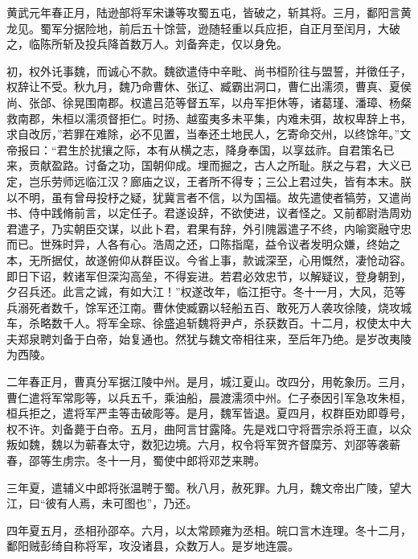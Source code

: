 \documentclass[12pt,UTF8]{ctexbook}
\begin{document}
黄武元年春正月，陆逊部将军宋谦等攻蜀五屯，皆破之，斩其将。三月，鄱阳言黄龙见。蜀军分据险地，前后五十馀营，逊随轻重以兵应拒，自正月至闰月，大破之，临陈所斩及投兵降首数万人。刘备奔走，仅以身免。

初，权外讬事魏，而诚心不款。魏欲遣侍中辛毗、尚书桓阶往与盟誓，并徵任子，权辞让不受。秋九月，魏乃命曹休、张辽、臧霸出洞口，曹仁出濡须，曹真、夏侯尚、张郃、徐晃围南郡。权遣吕范等督五军，以舟军拒休等，诸葛瑾、潘璋、杨粲救南郡，朱桓以濡须督拒仁。时扬、越蛮夷多未平集，内难未弭，故权卑辞上书，求自改厉，”若罪在难除，必不见置，当奉还土地民人，乞寄命交州，以终馀年。”文帝报曰：“君生於扰攘之际，本有从横之志，降身奉国，以享兹祚。自君策名已来，贡献盈路。讨备之功，国朝仰成。埋而掘之，古人之所耻。朕之与君，大义已定，岂乐劳师远临江汉？廊庙之议，王者所不得专；三公上君过失，皆有本末。朕以不明，虽有曾母投杼之疑，犹冀言者不信，以为国福。故先遣使者犒劳，又遣尚书、侍中践脩前言，以定任子。君遂设辞，不欲使进，议者怪之。又前都尉浩周劝君遣子，乃实朝臣交谋，以此卜君，君果有辞，外引隗嚣遣子不终，内喻窦融守忠而已。世殊时异，人各有心。浩周之还，口陈指麾，益令议者发明众嫌，终始之本，无所据仗，故遂俯仰从群臣议。今省上事，款诚深至，心用慨然，凄怆动容。即日下诏，敕诸军但深沟高垒，不得妄进。若君必效忠节，以解疑议，登身朝到，夕召兵还。此言之诚，有如大江！”权遂改年，临江拒守。冬十一月，大风，范等兵溺死者数千，馀军还江南。曹休使臧霸以轻船五百、敢死万人袭攻徐陵，烧攻城车，杀略数千人。将军全琮、徐盛追斩魏将尹卢，杀获数百。十二月，权使太中大夫郑泉聘刘备于白帝，始复通也。然犹与魏文帝相往来，至后年乃绝。是岁改夷陵为西陵。

二年春正月，曹真分军据江陵中州。是月，城江夏山。改四分，用乾象历。三月，曹仁遣将军常彫等，以兵五千，乘油船，晨渡濡须中州。仁子泰因引军急攻朱桓，桓兵拒之，遣将军严圭等击破彫等。是月，魏军皆退。夏四月，权群臣劝即尊号，权不许。刘备薨于白帝。五月，曲阿言甘露降。先是戏口守将晋宗杀将王直，以众叛如魏，魏以为蕲春太守，数犯边境。六月，权令将军贺齐督糜芳、刘邵等袭蕲春，邵等生虏宗。冬十一月，蜀使中郎将邓芝来聘。

三年夏，遣辅义中郎将张温聘于蜀。秋八月，赦死罪。九月，魏文帝出广陵，望大江，曰“彼有人焉，未可图也”，乃还。

四年夏五月，丞相孙邵卒。六月，以太常顾雍为丞相。皖口言木连理。冬十二月，鄱阳贼彭绮自称将军，攻没诸县，众数万人。是岁地连震。
\end{document}
